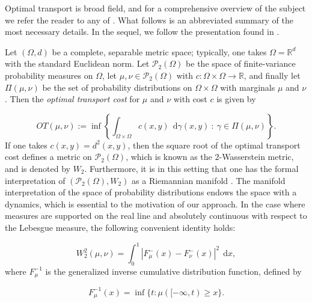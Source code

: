 \documentclass{article}
\newcommand{\R}{\mathbb{R}}
\newcommand{\diff}{\:\mathrm{d}}
\begin{document}
Optimal transport is broad field, and for a comprehensive overview of the subject we refer the reader to any of \cite{santambrogioOptimalTransportApplied2015, ambrosioLecturesOptimalTransport2021, villaniOptimalTransport2009, peyreComputationalOptimalTransport2020}. What follows is an abbreviated summary of the most necessary details.  In the sequel, we follow the presentation found in \cite{santambrogioOptimalTransportApplied2015}.

Let \((\Omega, d)\) be a complete, separable metric space; typically, one takes \(\Omega = \R^d\) with the standard Euclidean norm. Let \(\mathcal{P}_2(\Omega)\) be the space of finite-variance probability measures on \(\Omega\), let \(\mu, \nu \in \mathcal{P}_2(\Omega)\) with \(c : \Omega \times \Omega \to \mathbb{R}\), and finally let \(\Pi(\mu,\nu)\) be the set of probability distributions on \(\Omega\times\Omega\) with marginals \(\mu\) and \(\nu\). Then the \textit{optimal transport cost} for \(\mu\) and \(\nu\) with cost \(c\) is given by 

\begin{equation*}
    OT(\mu,\nu) := \inf\left\{\int_{\Omega\times\Omega} c(x,y) \: \diff \gamma(x,y) \: : \: \gamma \in \Pi(\mu, \nu)\right\}.
\end{equation*}If one takes \(c(x,y) = d^2(x,y)\), then the square root of the optimal transport cost defines a metric on \(\mathcal{P}_2(\Omega)\), which is known as the \(2\)-Wasserstein metric, and is denoted by \(W_2\). Furthermore, it is in this setting that one has the formal interpretation of \((\mathcal{P}_2(\Omega), W_2)\) as a Riemannian manifold \cite{jordanVariationalFormulationFokker1998,benamouComputationalFluidMechanics2000}. The manifold interpretation of the space of probability distributions endows the space with a dynamics, which is essential to the motivation of our approach.
In the case where measures are supported on the real line and absolutely continuous with respect to the Lebesgue measure, the following convenient identity holds:

\begin{equation}
\label{ot1d}
    W_2^2(\mu, \nu) = \int_0^1 |F_\mu^-(x) - F_\nu^-(x)|^2 \: \diff x,
\end{equation}where \(F_\mu^{-1}\) is the generalized inverse cumulative distribution function, defined by

\begin{equation*}
    F_\mu^{-1}(x) = \inf \{t : \mu([-\infty, t) \ge x\}.
\end{equation*}
\end{document}
